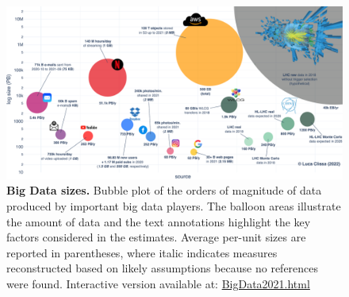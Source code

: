 \begin{landscape}
\begin{figure}
    \centering
    \includegraphics[width=\linewidth]{figures/220_introduction/BigData2021.pdf}
    \caption{\textbf{Big Data sizes.} Bubble plot of the orders of magnitude of data produced by important big data players. The balloon areas illustrate the amount of data and the text annotations highlight the key factors considered in the estimates. Average per-unit sizes are reported in parentheses, where italic indicates measures reconstructed based on likely assumptions because no references were found. Interactive version available at: \href{https://clissa.github.io/BigData2021/BigData2021.html}{BigData2021.html}}
    \label{fig:bigdata_size}
\end{figure}
\end{landscape}

